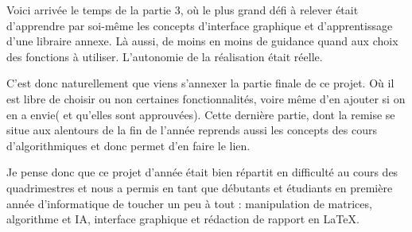 \documentclass[utf8]{article}
\begin{document}
\qquad Voici arrivée le temps de la partie 3, où le plus grand défi à relever était d'apprendre par soi-même les concepts d'interface graphique et d'apprentissage d'une libraire annexe. 
Là aussi, de moins en moins de guidance quand aux choix des fonctions à utiliser. L'autonomie de la réalisation était réelle.

\qquad C'est donc naturellement que viens s'annexer la partie finale de ce projet. Où il est libre de choisir ou non certaines fonctionnalités, voire même d'en ajouter si on en a envie( et qu'elles sont approuvées). Cette dernière partie, dont la remise se situe aux alentours de la fin de l'année reprends aussi les concepts des cours d'algorithmiques et donc permet d'en faire le lien.

\qquad Je pense donc que ce projet d'année était bien répartit en difficulté au cours des quadrimestres et nous a permis en tant que débutants et étudiants en première année d'informatique de toucher un peu à tout : manipulation de matrices, algorithme et IA, interface graphique et rédaction de rapport en LaTeX.
\end{document}
